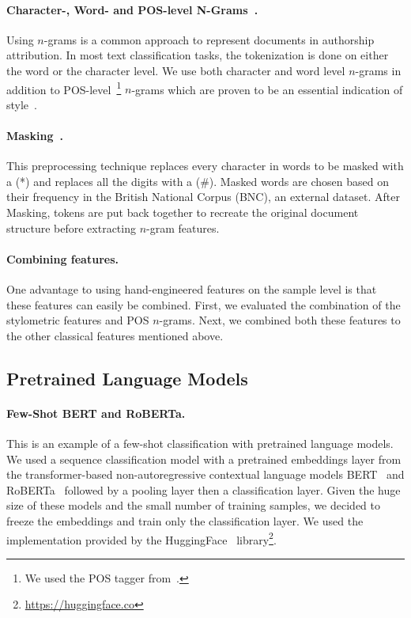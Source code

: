 \documentclass[11pt]{article}
\begin{document}
\paragraph{Character-, Word- and POS-level N-Grams~\citep{Stamatatos.E:2013,Sapkota.U:2014,sapkota2015not}.}
Using $n$-grams is a common approach to represent documents in authorship attribution. In most text classification tasks, the tokenization is done on either the word or the character level. We use both character and word level $n$-grams in addition to POS-level~\footnote{We used the POS tagger from~\citep{manning2014stanford}.} $n$-grams which are proven to be an essential indication of style~\citep{Ding.S:2015,sundararajan2018represents}. 

\paragraph{Masking~\citep{Stamatatos.E:2017,stamatatos2018masking}.}
This preprocessing technique replaces every character in words to be masked with a (*) and replaces all the digits with a ($\#$). Masked words are chosen based on their frequency in the British National Corpus (BNC), an external dataset. After Masking, tokens are put back together to recreate the original document structure before extracting $n$-gram features. 

\paragraph{Combining features.} One advantage to using hand-engineered features on the sample level is that these features can easily be combined. First, we evaluated the combination of the stylometric features and POS $n$-grams. Next, we combined both these features to the other classical features mentioned above. 


\subsection{Pretrained Language Models}

\paragraph{Few-Shot BERT and RoBERTa.}
This is an example of a few-shot classification with pretrained language models. We used a sequence classification model with a pretrained embeddings layer from the transformer-based non-autoregressive contextual language models BERT~\citet{devlin2019bert} and RoBERTa~\citep{liu2019roberta} followed by a pooling layer then a classification layer. Given the huge size of these models and the small number of training samples, we decided to freeze the embeddings and train only the classification layer. We used the implementation provided by the HuggingFace~\citep{Wolf2019HuggingFacesTS} library\footnote{\url{https://huggingface.co}}.
\end{document}
